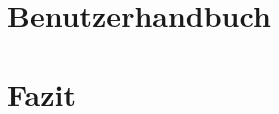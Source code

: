 \documentclass[12pt,a4paper,bibliography=totoc,listof=totoc]{scrartcl}
\begin{document}
\pagebreak
\section{Benutzerhandbuch}


\pagebreak
\section{Fazit}




\end{document}
